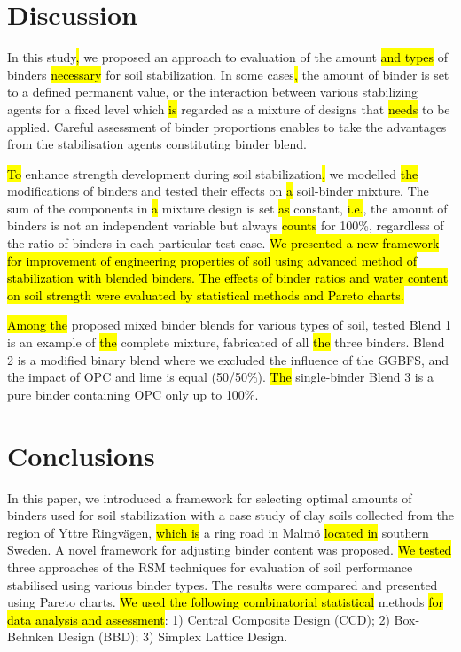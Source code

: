 \documentclass[eprint,
]{actapoly}
\begin{document}
\section{Discussion}
In this study\hl{, }we proposed an approach to evaluation of the amount \hl{and types }of binders \hl{necessary} for soil stabilization. In some cases\hl{, }the amount of binder is set to a defined permanent value, or the interaction between\hl{ }various stabilizing agents for a fixed level which \hl{is }regarded as a mixture of designs that \hl{needs }to be applied. Careful assessment of binder proportions enables to take the advantages from the stabilisation agents constituting\hl{ }binder blend. 

\hl{To }enhance\hl{ }strength development during soil stabilization\hl{, }we modelled \hl{the }modifications of binders and tested their effects on \hl{a }soil-binder mixture. The sum of the components in \hl{a }mixture design is set \hl{as }constant, \hl{i.e.}, the amount of binders is not an independent variable but always \hl{counts }for 100\%, regardless of the ratio of binders in each particular test case. \hl{We presented a new framework for improvement of engineering properties of soil using advanced method of stabilization with blended binders. The effects of binder ratios and water content on soil strength were evaluated by statistical methods and Pareto charts. }

\hl{Among the }proposed mixed binder blends for various types of soil, tested Blend 1 is an example of \hl{the }complete mixture, fabricated of all \hl{the }three\hl{ }binders. Blend 2 is a modified binary blend where we excluded the influence of the GGBFS, and the impact of OPC and lime is equal (50/50\%). \hl{The }single-binder Blend 3 is a pure binder containing OPC only up to 100\%. 

\section{Conclusions}
In this paper, we introduced a framework for selecting optimal amounts of binders used for soil stabilization with a case study of clay soils collected from the region of Yttre Ringvägen, \hl{which is }a ring road in Malmö\hl{ located in }southern Sweden. A novel framework for adjusting binder content was proposed. \hl{We tested }three approaches of the RSM techniques\hl{ }for evaluation of soil performance stabilised using various binder types. The results were compared and presented using Pareto charts. \hl{We used the following combinatorial statistical }methods \hl{for data analysis and assessment}: 1) Central Composite Design (CCD); 2) Box-Behnken Design (BBD); 3) Simplex Lattice Design. 
\end{document}
